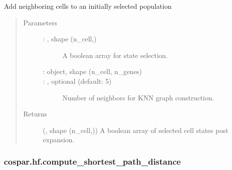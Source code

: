\documentclass[letterpaper,10pt,english]{sphinxmanual}
\begin{document}
\begin{fulllineitems}
\label{\detokenize{cospar.hf.add_neighboring_cells_to_a_map:cospar.hf.add_neighboring_cells_to_a_map}}
Add neighboring cells to an initially selected population
\begin{quote}\begin{description}
\item[{Parameters}] \leavevmode\begin{description}
\item[{ : , shape (n\_cell,)}] \leavevmode
A boolean array for state selection.

\item[{ :  object, shape (n\_cell, n\_genes)}] \leavevmode


\item[{ : , optional (default: 5)}] \leavevmode
Number of neighbors for KNN graph construction.

\end{description}

\item[{Returns}] \leavevmode
{} (, shape (n\_cell,)) \textendash{} A boolean array of selected cell states post expansion.

\end{description}\end{quote}

\end{fulllineitems}



\subsubsection{cospar.hf.compute\_shortest\_path\_distance}
\label{\detokenize{cospar.hf.compute_shortest_path_distance:cospar-hf-compute-shortest-path-distance}}\label{\detokenize{cospar.hf.compute_shortest_path_distance::doc}}
\end{document}
